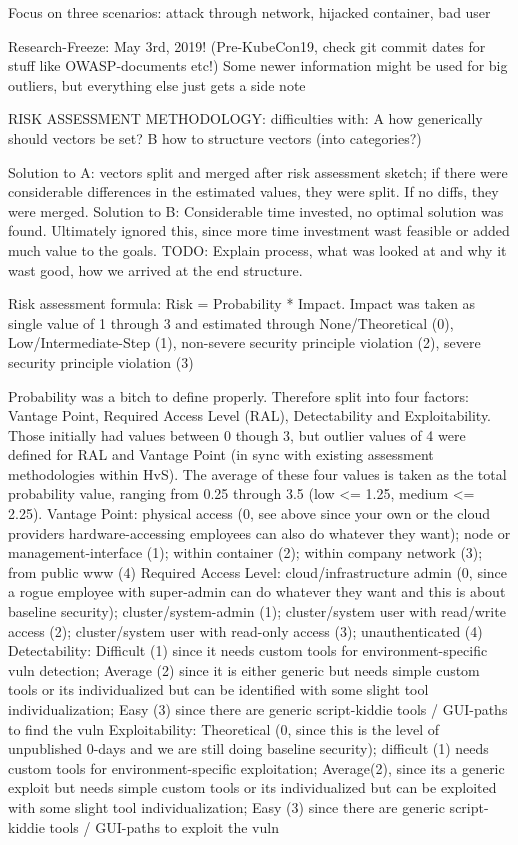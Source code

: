 Focus on three scenarios: attack through network, hijacked container, bad user

Research-Freeze: May 3rd, 2019! (Pre-KubeCon19, check git commit dates for stuff like OWASP-documents etc!)
Some newer information might be used for big outliers, but everything else just gets a side note

RISK ASSESSMENT METHODOLOGY:
difficulties with: 
A how generically should vectors be set?
B how to structure vectors (into categories?) 

Solution to A: vectors split and merged after risk assessment sketch; if there were considerable differences in the estimated values, they were split. If no diffs, they were merged.
Solution to B: Considerable time invested, no optimal solution was found. Ultimately ignored this, since more time investment wast feasible or added much value to the goals. TODO: Explain process, what was looked at and why it wast good, how we arrived at the end structure.

Risk assessment formula:
Risk = Probability * Impact.
Impact was taken as single value of 1 through 3  and estimated through None/Theoretical (0), Low/Intermediate-Step (1), non-severe security principle violation (2), severe security principle violation (3)

Probability was a bitch to define properly. Therefore split into four factors: Vantage Point, Required Access Level (RAL), Detectability and Exploitability. Those initially had values between 0 though 3, but outlier values of 4  were defined for RAL and Vantage Point (in sync with existing assessment methodologies within HvS).
The average of these four values is taken as the total probability value, ranging from 0.25 through 3.5 (low <= 1.25, medium <= 2.25).
Vantage Point: physical access (0, see above since your own or the cloud providers hardware-accessing employees can also do whatever they want); node or management-interface (1); within container (2); within company network (3); from public www (4)
Required Access Level: cloud/infrastructure admin (0, since a rogue employee with super-admin can do whatever they want and this is about baseline security); cluster/system-admin (1); cluster/system user with read/write access (2); cluster/system user with read-only access (3); unauthenticated (4)
Detectability: Difficult (1) since it needs custom tools for environment-specific vuln detection; Average (2) since it is either generic but needs simple custom tools or its individualized but can be identified with some slight tool individualization; Easy (3) since there are generic script-kiddie tools / GUI-paths to find the vuln
Exploitability: Theoretical (0, since this is the level of unpublished 0-days and we are still doing baseline security); difficult (1) needs custom tools for environment-specific exploitation; Average(2), since its a generic exploit but needs simple custom tools or its individualized but can be exploited with some slight tool individualization; Easy (3) since there are generic script-kiddie tools / GUI-paths to exploit the vuln

